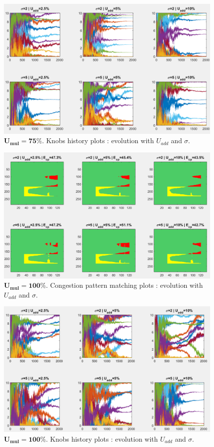 \begin{figure}
	\label{fig:umulknobs75}
	\caption{$\mathbf{U_{mul}=75\%}$. Knobs history plots : evolution with $U_{add}$ and $\sigma$.}
	\includegraphics[width=7in]{figures/results_figures/Umul/knobs_Umul_75_lambda_11.png}
\end{figure}	
\begin{figure}
	\label{fig:umulcp100}
	\caption{$\mathbf{U_{mul}=100\%}$. Congestion pattern matching plots : evolution with $U_{add}$ and $\sigma$.}
	\includegraphics[width=7in]{figures/results_figures/Umul/cp_Umul_100_lambda_11.png}
\end{figure}
\begin{figure}
	\label{fig:umulknobs100}
	\caption{$\mathbf{U_{mul}=100\%}$. Knobs history plots : evolution with $U_{add}$ and $\sigma$.}
	\includegraphics[width=7in]{figures/results_figures/Umul/knobs_Umul_100_lambda_11.png}
\end{figure}	
